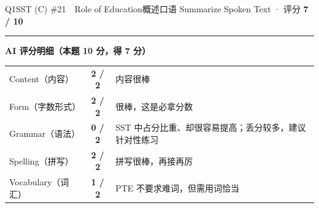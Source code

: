 \documentclass[11pt]{article}
\newcommand{\ptesub}[1]{%
  \par\needspace{2\baselineskip}\smallskip
  {\color{cAccent}\rule[-0.2ex]{3pt}{1.05em}}\hspace{6pt}%
  {\bfseries\color{cHead}#1}\par\nopagebreak\smallskip}
\begin{document}
\begin{qblock}{Q1\quad SST (C) \#21\ \ Role of Education}{概述口语 Summarize Spoken Text · 评分 \textcolor{cAccent}{\bfseries 7 / 10}}
\ptesub{AI 评分明细（本题 10 分，得 \textcolor{cAccent}{\bfseries 7} 分）}
\begin{notebox}\small
\begin{tabular}{@{}lcl@{}}
Content（内容）& \textbf{2 / 2} & 内容很棒\\
Form（字数形式）& \textbf{2 / 2} & 很棒，这是必拿分数\\
Grammar（语法）& \textcolor{cWrong}{\bfseries 0 / 2} & SST 中占分比重、却很容易提高；丢分较多，建议针对性练习\\
Spelling（拼写）& \textbf{2 / 2} & 拼写很棒，再接再厉\\
Vocabulary（词汇）& \textbf{1 / 2} & PTE 不要求难词，但需用词恰当\\
\end{tabular}
\end{notebox}
\end{qblock}
\end{document}
